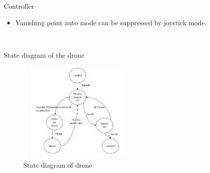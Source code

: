 \documentclass[8pt]{beamer}
\begin{document}
{{\begin{frame}{Controller}
\begin{itemize}
\setlength\itemsep{1em}
 \item Vanishing point auto mode can be suppressed by joystick mode.
\end{itemize}\\[5pt]
{\centering State diagram of the drone\par}
\begin{figure}
\includegraphics[width=6cm, height=5cm]{images/Statediagram1.png}%
\caption{State diagram of drone}
\end{figure}

\end{frame}

}}
\end{document}
